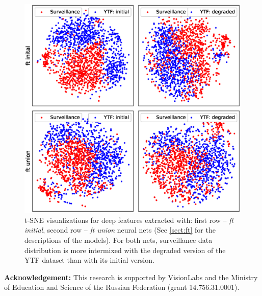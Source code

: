  

  \begin{figure}
  \centering
    \includegraphics[width=\linewidth]{Chapters/face/Fig6.eps}
    \caption{t-SNE \citep{maaten2008visualizing} visualizations for deep features extracted with: first row -- \textit{ft initial}, second row -- \textit{ft union} neural nets (See \ref{sect:ft} for the descriptions of the models). For both nets, surveillance data distribution is more intermixed with the degraded version of the YTF dataset than with its initial version.}\label{fig:tsne}
  \end{figure}



\textbf{Acknowledgement:}  This research is supported by VisionLabs and the Ministry of Education and Science of the Russian Federation (grant 14.756.31.0001). 





